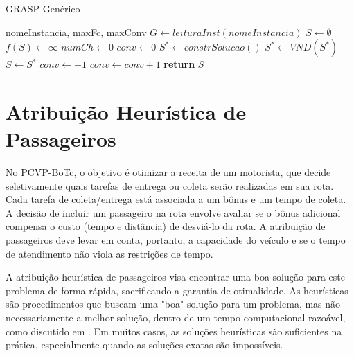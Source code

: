 \documentclass[12pt, a4paper]{report}
\begin{document}
\begin{algorithm}[H]
    \caption{GRASP Genérico}
    \begin{algorithmic}[1]
        \Require nomeInstancia, maxFc, maxConv
        \State $G \gets leituraInst(nomeInstancia)$
        \State $S \gets \emptyset$ 
        \State $f(S) \gets \infty$ 
        \State $numCh \gets 0$ 
        \State $conv \gets 0$ 
            \State $S^* \gets constrSolucao()$ 
            \State $S^* \gets VND(S^*)$ 
                \State $S \gets S^*$ 
                \State $conv \gets -1$ 
            \EndIf
            \State $conv \gets conv + 1$ 
        \EndWhile
        \State \textbf{return} $S$ 
    \end{algorithmic}
    \end{algorithm}

\section*{Atribuição Heurística de Passageiros}

No PCVP-BoTc, o objetivo é otimizar a receita de um motorista, que decide seletivamente quais tarefas de entrega ou coleta serão realizadas em sua rota. Cada tarefa de coleta/entrega está associada a um bônus e um tempo de coleta. A decisão de incluir um passageiro na rota envolve avaliar se o bônus adicional compensa o custo (tempo e distância) de desviá-lo da rota. A atribuição de passageiros deve levar em conta, portanto, a capacidade do veículo e se o tempo de atendimento não viola as restrições de tempo.

A atribuição heurística de passageiros visa encontrar uma boa solução para este problema de forma rápida, sacrificando a garantia de otimalidade. As heurísticas são procedimentos que buscam uma "boa" solução para um problema, mas não necessariamente a melhor solução, dentro de um tempo computacional razoável, como discutido em \cite{carnielli}. Em muitos casos, as soluções heurísticas são suficientes na prática, especialmente quando as soluções exatas são impossíveis.
\end{document}
